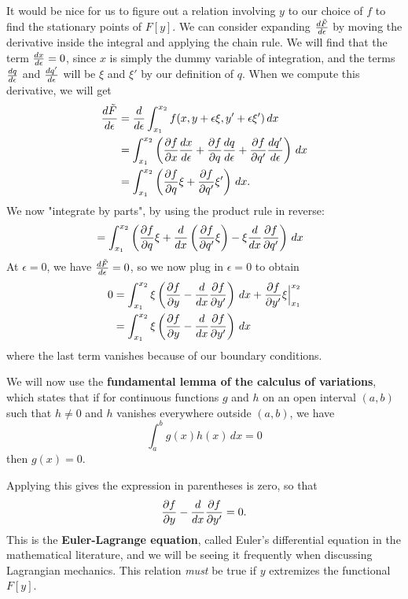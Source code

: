 It would be nice for us to figure out a relation involving $y$ to our choice of $f$ to find the stationary points of $F[y]$. We can consider expanding $\frac{d \tilde{F}}{d \epsilon}$ by moving the derivative inside the integral and applying the chain rule. We will find that the term $\frac{d x}{d \epsilon} = 0$, since $x$ is simply the dummy variable of integration, and the terms $\frac{d q}{d \epsilon}$ and $\frac{d q'}{d \epsilon}$ will be $\xi$ and $\xi'$ by our definition of $q$. When we compute this derivative, we will get 
\begin{align*}
\frac{d \tilde{F}}{d \epsilon} &= \frac{d }{d \epsilon} \int_{x_1}^{x_2} f(x, y + \epsilon \xi, y' + \epsilon \xi') \, dx \\
&= \int_{x_1}^{x_2} \left(\frac{\partial f}{\partial x} \frac{d x}{d \epsilon} + \frac{\partial f}{\partial q} \frac{d q}{d \epsilon} + \frac{\partial f}{\partial q'} \frac{d q'}{d \epsilon} \right) \, dx \\
&= \int_{x_1}^{x_2} \left(\frac{\partial f}{\partial q}\xi + \frac{\partial f}{\partial q'} \xi' \right) \, dx.
\end{align*}
We now "integrate by parts", by using the product rule in reverse: 
\begin{align*}
	&= \int_{x_1}^{x_2} \left(\frac{\partial f}{\partial q}\xi + \frac{d }{d x}\left(\frac{\partial f}{\partial q'}\xi \right) - \xi \frac{d }{d x} \frac{\partial f}{\partial q'}\right) \, dx  
\end{align*}
At $\epsilon = 0$, we have $\frac{d \tilde{F}}{d \epsilon} = 0$, so we now plug in $\epsilon = 0$ to obtain
\begin{align*}
	0 &= \int_{x_1}^{x_2} \xi\left(\frac{\partial f}{\partial y} - \frac{d }{d x} \frac{\partial f}{\partial y'}\right) \, dx + \frac{\partial f}{\partial y'}\xi \Big|_{x_1}^{x_2} \\
	&= \int_{x_1}^{x_2} \xi\left(\frac{\partial f}{\partial y} - \frac{d }{d x} \frac{\partial f}{\partial y'}\right) \, dx 
\end{align*}
where the last term vanishes because of our boundary conditions. 

We will now use the \textbf{fundamental lemma of the calculus of variations}, which states that if for continuous functions $g$ and $h$ on an open interval $(a, b)$ such that $h \neq 0$ and $h$ vanishes everywhere outside $(a,b)$, we have
\[
	\int_a^b g(x)h(x) \, dx = 0
\]
then $g(x) = 0$. 

Applying this gives the expression in parentheses is zero, so that
\[
	\frac{\partial f}{\partial y} - \frac{d }{d x} \frac{\partial f}{\partial y'} = 0.
\]
This is the \textbf{Euler-Lagrange equation}, called Euler's differential equation in the mathematical literature, and we will be seeing it frequently when discussing Lagrangian mechanics. This relation \textit{must} be true if $y$ extremizes the functional $F[y]$. 

